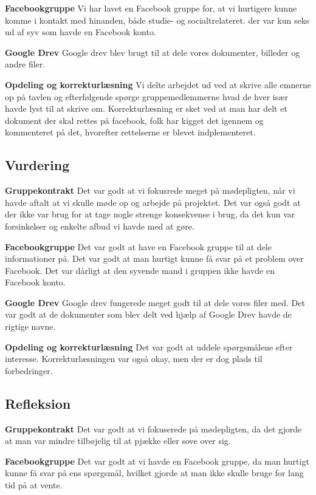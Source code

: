 \textbf{Facebookgruppe}
Vi har lavet en Facebook gruppe for, at vi hurtigere kunne komme i kontakt med hinanden, både studie- og socialtrelateret. der var kun seks ud af syv som havde en Facebook konto.

\textbf{Google Drev}
Google drev blev brugt til at dele vores dokumenter, billeder og andre filer.

\textbf{Opdeling og korrekturlæsning}
Vi delte arbejdet ud ved at skrive alle emnerne op på tavlen og efterfølgende spørge gruppemedlemmerne hvad de hver især havde lyst til at skrive om. Korrekturlæsning er sket ved at man har delt et dokument der skal rettes på facebook, folk har kigget det igennem og kommenteret på det, hvorefter rettelserne er blevet indplementeret.

\subsection{Vurdering}
\textbf{Gruppekontrakt}
Det var godt at vi fokusrede meget på mødepligten, når vi havde aftalt at vi skulle møde op og arbejde på projektet. Det var også godt at der ikke var brug for at tage nogle strenge konsekvense i brug, da det kun var forsinkelser og enkelte afbud vi havde med at gøre.


\textbf{Facebookgruppe}
Det var godt at have en Facebook gruppe til at dele informationer på. Det var godt at man hurtigt kunne få svar på et problem over Facebook. Det var dårligt at den syvende mand i gruppen ikke havde en Facebook konto.


\textbf{Google Drev}
Google drev fungerede meget godt til at dele vores filer med. Det var godt at de dokumenter som blev delt ved hjælp af Google Drev havde de rigtige navne.


\textbf{Opdeling og korrekturlæsning}
Det var godt at uddele spørgsmålene efter interesse. Korrekturlæsningen var også okay, men der er dog plads til forbedringer.



\subsection{Refleksion}
\textbf{Gruppekontrakt}
Det var godt at vi fokuserede på mødepligten, da det gjorde at man var mindre tilbøjelig til at pjække eller sove over sig.


\textbf{Facebookgruppe}
Det var godt at vi havde en Facebook gruppe, da man hurtigt kunne få svar på ens spørgsmål, hvilket gjorde at man ikke skulle bruge for lang tid på at vente.


